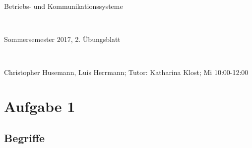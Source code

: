 \documentclass[numbers=noendperiod]{scrartcl}
\begin{document}
	
\newcommand{\inputmintedframed}[2]{
	\begin{mdframed}[linecolor=bg,backgroundcolor=bg]
		\inputminted[mathescape,breaklines,linenos,numbersep=5pt,tabsize=3]{#1}{#2}
	\end{mdframed}}
	
\hrulefill
\begin{center}
	\bfseries %
	\sffamily %
	\begin{huge}
		Betriebs- und Kommunikationssysteme
	\end{huge}\\
	\begin{Large}
		Sommersemester 2017, 2. Übungsblatt
	\end{Large}\\
	\begin{small}
		Christopher Husemann, Luis Herrmann; Tutor: Katharina Klost; Mi 10:00-12:00
	\end{small}
	
	\vspace{-10pt}
\end{center}
\hrulefill

\section*{Aufgabe 1}
\subsection*{Begriffe}
\end{document}
